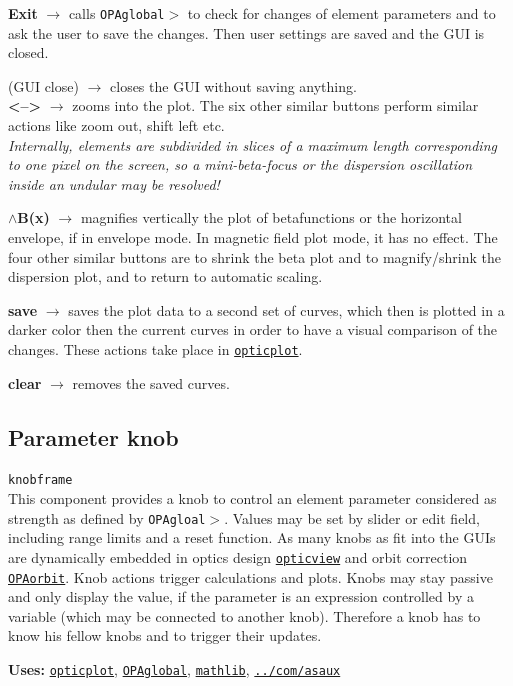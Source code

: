 \documentclass[12pt]{article}
\newcommand\code[1]{{\tt #1}}
\newcommand{\ofld}[1]{\colorbox{black!15}{{\bf #1}}}
\newcommand{\ofldx}[1]{\colorbox{black!15}{(#1)}}
\newcommand\guico[1]{{\color{blue}\code{#1}}}
\newcommand{\unico}[1]{{\color{burntorange}\code{#1}}}
\newcommand{\evcod}[2]{\ofld{#1} $\rightarrow$ \guico{#2}}
\newcommand{\evcodx}[2]{\ofldx{#1} $\rightarrow$ \guico{#2}}
\newcommand{\prcod}[2]{\opauni{#1}$>$\unico{#2}}
\newcommand{\opagui}[1]{\colorbox{blue!20}{\code{#1}}}
\newcommand{\ogui}[1]{\hyperref[#1]{\opagui{#1}}}
\newcommand{\opaguif}[1]{\colorbox{violet!30}{\code{#1}}}
\newcommand{\oguifh}[2]{\subsection{\label{#2}#1}{\Huge\opaguif{#2}}\\}
\newcommand{\opauni}[1]{\colorbox{orange!30}{\code{#1}}}
\newcommand{\ouni}[1]{\hyperref[#1]{\opauni{#1}}}
\newcommand{\uses}[1]{{\bf Uses: } #1}
\newcommand{\desc}[1]{#1}
\newcommand{\feature}[1]{{\color{cadmiumgreen}\em #1}}
\begin{document}
{\evcod{Exit}{butexitClick} calls \prcod{OPAglobal}{EllaSave} to check for changes of element parameters and to ask the user to save the changes. Then user settings are saved and the GUI is closed.

\evcodx{GUI close}{FormClose} closes the GUI without saving anything.\\

\evcod{\textless--\textgreater}{buzoominClick} zooms into the plot. The six other similar buttons perform similar actions like zoom out, shift left etc.\\ \feature{Internally, elements are subdivided in slices of a maximum length corresponding to one pixel on the screen, so a mini-beta-focus or the dispersion oscillation inside an undular may be resolved!}

\evcod{$\wedge$B(x)}{buyupClick} magnifies vertically the plot of betafunctions or the horizontal envelope, if in envelope mode. In magnetic field plot mode, it has no effect. The four other similar buttons are to shrink the beta plot and to magnify/shrink  the dispersion plot, and to return to automatic scaling.

\evcod{save}{bucsaveClick} saves the plot data to a second set of curves, which then is plotted in a darker color then the current curves in order to have a visual comparison of the changes. These actions take place in \ouni{opticplot}.

\evcod{clear}{bucclearClick} removes the saved curves.

}




\oguifh{Parameter knob}{knobframe} 

\desc{This component provides a knob to control an element parameter considered as strength as defined by \prcod{OPAgloal}{putkval/getkval}. Values may be set by slider or edit field, including range limits and a reset function. As many knobs as fit into the GUIs are dynamically embedded in optics design \ogui{opticview} and orbit correction \ogui{OPAorbit}. Knob actions trigger calculations and plots. Knobs may stay passive and only display the value, if the parameter is an expression controlled by a variable (which may be connected to another knob). Therefore a knob has to know his fellow knobs and to trigger their updates.}

\uses{\ouni{opticplot}, \ouni{OPAglobal}, \ouni{mathlib}, \ouni{../com/asaux}} 
 
\end{document}
